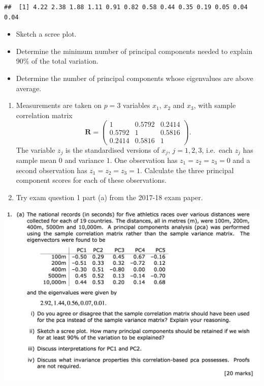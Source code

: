 \documentclass[
]{book}
\providecommand{\tightlist}{%
  \setlength{\itemsep}{0pt}\setlength{\parskip}{0pt}}
\theoremstyle{definition}
\theoremstyle{definition}
\theoremstyle{definition}
\theoremstyle{definition}
\theoremstyle{remark}
\begin{document}
\begin{verbatim}
##  [1] 4.22 2.38 1.88 1.11 0.91 0.82 0.58 0.44 0.35 0.19 0.05 0.04 0.04
\end{verbatim}

\begin{itemize}
\tightlist
\item
  Sketch a scree plot.
\item
  Determine the minimum number of principal components needed to explain 90\% of the total variation.
\item
  Determine the number of principal components whose eigenvalues are above average.
\end{itemize}

\begin{enumerate}
\def\labelenumi{\arabic{enumi}.}
\setcounter{enumi}{3}
\item
  Measurements are taken on \(p=3\) variables \(x_1\), \(x_2\) and \(x_3\), with sample correlation matrix
  \[
   \mathbf R= \begin{pmatrix} 1 & 0.5792 & 0.2414 \\ 0.5792 & 1 & 0.5816 \\ 0.2414 & 0.5816 & 1 \end{pmatrix}.
  \]
  The variable \(z_j\) is the standardised versions of \(x_j\), \(j=1,2,3\), i.e.~each \(z_j\) has sample mean \(0\) and variance \(1\).
  One observation has \(z_1 = z_2 = z_3 = 0\) and a second observation has \(z_1 = z_2 = z_3 =1\). Calculate the three
  principal component scores for
  each of these observations.
\item
  Try exam question 1 part (a) from the 2017-18 exam paper.
\end{enumerate}

\includegraphics{figs/PCA_2017_18_Q1.png}
\end{document}
